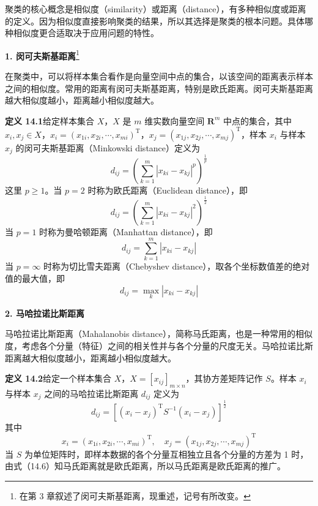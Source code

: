 \documentclass[UTF8, 12pt, fontset=fandol, oneside]{ctexart}
\begin{document}
聚类的核心概念是相似度（similarity）或距离（distance），有多种相似度或距离的定义。因为相似度直接影响聚类的结果，所以其选择是聚类的根本问题。具体哪种相似度更合适取决于应用问题的特性。

\noindent\textbf{1. 闵可夫斯基距离}\footnote{在第 3 章叙述了闵可夫斯基距离，现重述，记号有所改变。}

在聚类中，可以将样本集合看作是向量空间中点的集合，以该空间的距离表示样本之间的相似度。常用的距离有闵可夫斯基距离，特别是欧氏距离。闵可夫斯基距离越大相似度越小，距离越小相似度越大。

\noindent\textbf{定义 14.1}\quad 给定样本集合 $X$，$X$ 是 $m$ 维实数向量空间 $\mathbf{R}^m$ 中点的集合，其中 $x_i,x_j\in X$，$x_i=(x_{1i},x_{2i},\cdots,x_{mi})^{\mathrm{T}}$，$x_j=(x_{1j},x_{2j},\cdots,x_{mj})^{\mathrm{T}}$，样本 $x_i$ 与样本 $x_j$ 的闵可夫斯基距离（Minkowski distance）定义为
\begin{equation}
d_{ij}=\left(\sum_{k=1}^m |x_{ki}-x_{kj}|^p\right)^{\frac{1}{p}}
\tag{14.2}
\end{equation}
这里 $p\geqslant 1$。当 $p=2$ 时称为欧氏距离（Euclidean distance），即
\begin{equation}
d_{ij}=\left(\sum_{k=1}^m |x_{ki}-x_{kj}|^2\right)^{\frac{1}{2}}
\tag{14.3}
\end{equation}
当 $p=1$ 时称为曼哈顿距离（Manhattan distance），即
\begin{equation}
d_{ij}=\sum_{k=1}^m |x_{ki}-x_{kj}|
\tag{14.4}
\end{equation}
当 $p=\infty$ 时称为切比雪夫距离（Chebyshev distance），取各个坐标数值差的绝对值的最大值，即
\begin{equation}
d_{ij}=\max_k |x_{ki}-x_{kj}|
\tag{14.5}
\end{equation}

\noindent\textbf{2. 马哈拉诺比斯距离}

马哈拉诺比斯距离（Mahalanobis distance），简称马氏距离，也是一种常用的相似度，考虑各个分量（特征）之间的相关性并与各个分量的尺度无关。马哈拉诺比斯距离越大相似度越小，距离越小相似度越大。

\noindent\textbf{定义 14.2}\quad 给定一个样本集合 $X$，$X=[x_{ij}]_{m\times n}$，其协方差矩阵记作 $S$。样本 $x_i$ 与样本 $x_j$ 之间的马哈拉诺比斯距离 $d_{ij}$ 定义为
\begin{equation}
d_{ij}=\left[(x_i-x_j)^{\mathrm{T}}S^{-1}(x_i-x_j)\right]^{\frac{1}{2}}
\tag{14.6}
\end{equation}
其中
\begin{equation}
x_i=(x_{1i},x_{2i},\cdots,x_{mi})^{\mathrm{T}},\quad
x_j=(x_{1j},x_{2j},\cdots,x_{mj})^{\mathrm{T}}
\tag{14.7}
\end{equation}
当 $S$ 为单位矩阵时，即样本数据的各个分量互相独立且各个分量的方差为 1 时，由式（14.6）知马氏距离就是欧氏距离，所以马氏距离是欧氏距离的推广。
\end{document}
